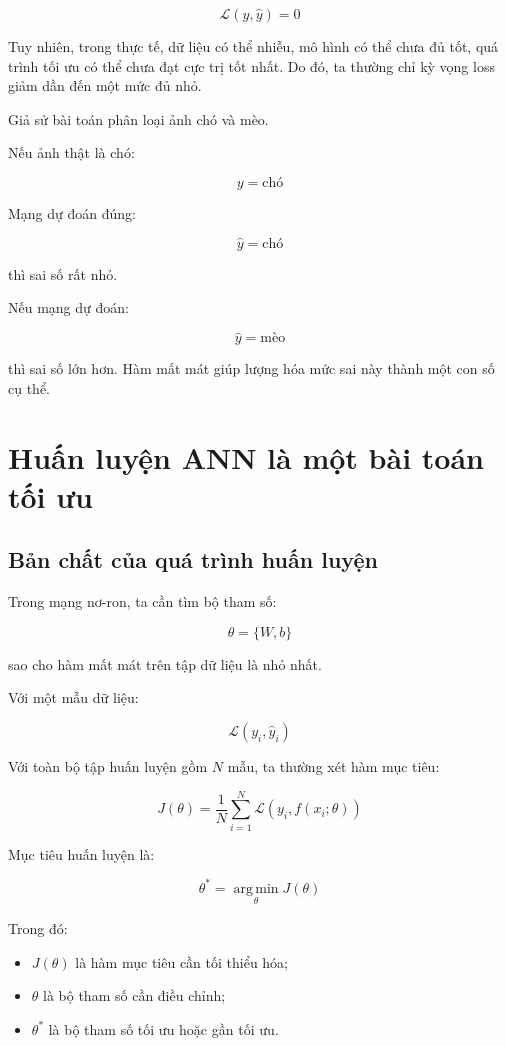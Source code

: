 \documentclass[12pt,a4paper]{report}
\begin{document}
\[
    \mathcal{L}(y,\hat{y}) = 0
\]

Tuy nhiên, trong thực tế, dữ liệu có thể nhiễu, mô hình có thể chưa đủ tốt, quá trình tối ưu có thể chưa đạt cực trị tốt nhất. Do đó, ta thường chỉ kỳ vọng loss giảm dần đến một mức đủ nhỏ.

\begin{vidu}
Giả sử bài toán phân loại ảnh chó và mèo.

Nếu ảnh thật là chó:

\[
    y = \text{chó}
\]

Mạng dự đoán đúng:

\[
    \hat{y} = \text{chó}
\]

thì sai số rất nhỏ.

Nếu mạng dự đoán:

\[
    \hat{y} = \text{mèo}
\]

thì sai số lớn hơn. Hàm mất mát giúp lượng hóa mức sai này thành một con số cụ thể.
\end{vidu}

\chapter{Huấn luyện ANN là một bài toán tối ưu}

\section{Bản chất của quá trình huấn luyện}

Trong mạng nơ-ron, ta cần tìm bộ tham số:

\[
    \theta = \{W,b\}
\]

sao cho hàm mất mát trên tập dữ liệu là nhỏ nhất.

Với một mẫu dữ liệu:

\[
    \mathcal{L}(y_i,\hat{y}_i)
\]

Với toàn bộ tập huấn luyện gồm $N$ mẫu, ta thường xét hàm mục tiêu:

\[
    J(\theta)
    =
    \frac{1}{N}
    \sum_{i=1}^{N}
    \mathcal{L}\left(y_i, f(x_i;\theta)\right)
\]

Mục tiêu huấn luyện là:

\[
    \theta^*
    =
    \operatorname*{arg\,min}_{\theta} J(\theta)
\]

Trong đó:

\begin{itemize}
    \item $J(\theta)$ là hàm mục tiêu cần tối thiểu hóa;
    \item $\theta$ là bộ tham số cần điều chỉnh;
    \item $\theta^*$ là bộ tham số tối ưu hoặc gần tối ưu.
\end{itemize}
\end{document}
